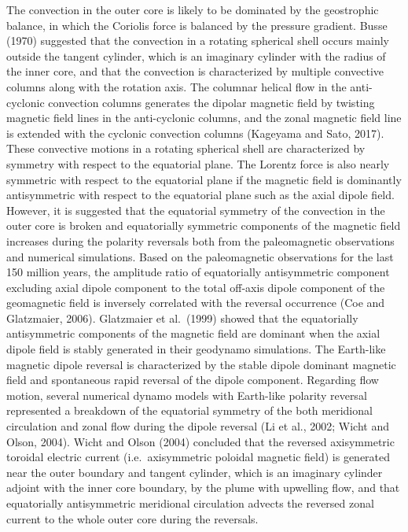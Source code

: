 The convection in the outer core is likely to be dominated by the geostrophic balance, in which the Coriolis force is balanced by the pressure gradient.
Busse (1970) 
suggested that the convection in a rotating spherical shell occurs mainly outside the tangent cylinder, which is an imaginary cylinder with the radius of the inner core, and that the convection is characterized by multiple convective columns along with the rotation axis. 
The columnar helical flow in the anti-cyclonic convection columns generates the dipolar magnetic field by twisting magnetic field lines in the anti-cyclonic columns, and the zonal magnetic field line is extended with the cyclonic convection columns (Kageyama and Sato, 2017). %
{\color{red}
These convective motions in a rotating spherical shell are characterized by symmetry with respect to the equatorial plane.
The Lorentz force is also nearly symmetric with respect to the equatorial plane if the magnetic field is dominantly antisymmetric with respect to the equatorial plane such as the axial dipole field.
}
However, it is suggested that the equatorial symmetry of the convection in the outer core is broken and equatorially symmetric components of the magnetic field increases during the polarity reversals both from the paleomagnetic observations and numerical simulations. %
Based on the paleomagnetic observations for the last 150 million years, the amplitude ratio of equatorially antisymmetric component excluding axial dipole component to the total off-axis dipole component of the geomagnetic field is inversely correlated with the reversal occurrence (Coe and Glatzmaier, 2006). %
Glatzmaier et al.\ (1999) %
showed that the equatorially antisymmetric components of the magnetic field are dominant when the axial dipole field is stably generated in their geodynamo simulations. 
The Earth-like magnetic dipole reversal is characterized by the stable dipole dominant magnetic field and spontaneous rapid reversal of the dipole component. 
Regarding flow motion, several numerical dynamo models with Earth-like polarity reversal represented a breakdown of the equatorial symmetry of the both meridional circulation and zonal flow  during the dipole reversal (Li et al., 2002; %
Wicht and Olson, 2004). %
Wicht and Olson (2004) concluded that the reversed axisymmetric toroidal electric current (i.e.\ axisymmetric poloidal magnetic field) is generated near the outer boundary and tangent cylinder, which is an imaginary cylinder adjoint with the inner core boundary, by the plume with upwelling flow, and that equatorially antisymmetric meridional circulation advects the reversed zonal current to the whole outer core during the reversals.

